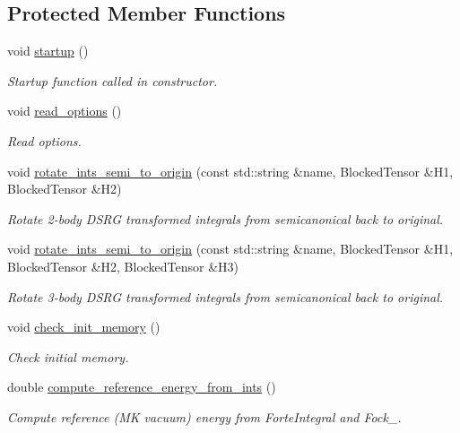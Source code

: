 \subsection*{Protected Member Functions}
\begin{DoxyCompactItemize}
\item 
void \mbox{\hyperlink{classforte_1_1_s_a_d_s_r_g_a100d67f2bd75b51bfaa9a7e1b1c4ac75}{startup}} ()
\begin{DoxyCompactList}\small\item\em Startup function called in constructor. \end{DoxyCompactList}\item 
void \mbox{\hyperlink{classforte_1_1_s_a_d_s_r_g_ac436b828391e51da6e361dce8982b6f2}{read\+\_\+options}} ()
\begin{DoxyCompactList}\small\item\em Read options. \end{DoxyCompactList}\item 
void \mbox{\hyperlink{classforte_1_1_s_a_d_s_r_g_ae66cb0e5c905a50ff70b69fbb3ff81fc}{rotate\+\_\+ints\+\_\+semi\+\_\+to\+\_\+origin}} (const std\+::string \&name, Blocked\+Tensor \&H1, Blocked\+Tensor \&H2)
\begin{DoxyCompactList}\small\item\em Rotate 2-\/body D\+S\+RG transformed integrals from semicanonical back to original. \end{DoxyCompactList}\item 
void \mbox{\hyperlink{classforte_1_1_s_a_d_s_r_g_ac0394785b738ca0ac43c5a040b591c71}{rotate\+\_\+ints\+\_\+semi\+\_\+to\+\_\+origin}} (const std\+::string \&name, Blocked\+Tensor \&H1, Blocked\+Tensor \&H2, Blocked\+Tensor \&H3)
\begin{DoxyCompactList}\small\item\em Rotate 3-\/body D\+S\+RG transformed integrals from semicanonical back to original. \end{DoxyCompactList}\item 
void \mbox{\hyperlink{classforte_1_1_s_a_d_s_r_g_ab09ff868bccb32043791cd3e7b8c8fef}{check\+\_\+init\+\_\+memory}} ()
\begin{DoxyCompactList}\small\item\em Check initial memory. \end{DoxyCompactList}\item 
double \mbox{\hyperlink{classforte_1_1_s_a_d_s_r_g_aaf7c3764bf6d3d08a8340ce37ca053db}{compute\+\_\+reference\+\_\+energy\+\_\+from\+\_\+ints}} ()
\begin{DoxyCompactList}\small\item\em Compute reference (MK vacuum) energy from Forte\+Integral and Fock\+\_\+. \end{DoxyCompactList}\item 

\end{DoxyCompactItemize}
